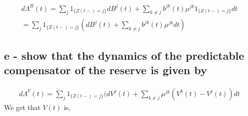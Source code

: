 \documentclass[12pt]{article}
\begin{document}
\begin{equation}
\begin{split}
d\Lambda^B(t) = \sum_j1_{\{Z(t-)=j\}}dB^j(t) + \sum_{k\neq j}b^{jk}(t)\mu^{jk}1_{\{Z(t-)= j\}}dt \\
= \sum_j1_{\{Z(t-)=j\}} (dB^j(t) + \sum_{k\neq j}b^{jk}(t)\mu^{jk}dt)
\end{split}
\end{equation}

\newpage

\subsection{e - show that the dynamics of the predictable compensator of the reserve is given by}

\begin{equation}
\begin{split}
d\Lambda^V (t) = \sum_j 1_{\{Z(t-)=j \}}(dV^j(t) + \sum_{k\neq j}\mu^{jk}(V^k(t)-V^j(t))dt
\end{split}
\end{equation}
We get that $V(t)$ is, 
\end{document}
